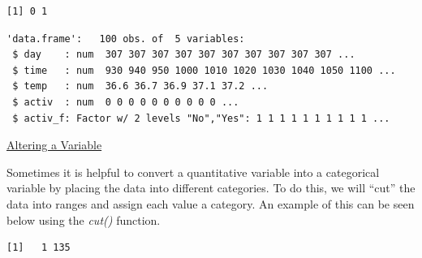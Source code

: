 \documentclass[
  letterpaper,
  DIV=11,
  numbers=noendperiod]{scrreprt}
\newenvironment{Shaded}{\begin{snugshade}}{\end{snugshade}}
\newcommand{\AttributeTok}[1]{\textcolor[rgb]{0.40,0.45,0.13}{#1}}
\newcommand{\ConstantTok}[1]{\textcolor[rgb]{0.56,0.35,0.01}{#1}}
\newcommand{\DecValTok}[1]{\textcolor[rgb]{0.68,0.00,0.00}{#1}}
\newcommand{\FunctionTok}[1]{\textcolor[rgb]{0.28,0.35,0.67}{#1}}
\newcommand{\NormalTok}[1]{\textcolor[rgb]{0.00,0.23,0.31}{#1}}
\newcommand{\OtherTok}[1]{\textcolor[rgb]{0.00,0.23,0.31}{#1}}
\newcommand{\SpecialCharTok}[1]{\textcolor[rgb]{0.37,0.37,0.37}{#1}}
\newcommand{\StringTok}[1]{\textcolor[rgb]{0.13,0.47,0.30}{#1}}
\begin{document}
\begin{verbatim}
[1] 0 1
\end{verbatim}

\begin{Shaded}
\end{Shaded}

\begin{verbatim}
'data.frame':   100 obs. of  5 variables:
 $ day    : num  307 307 307 307 307 307 307 307 307 307 ...
 $ time   : num  930 940 950 1000 1010 1020 1030 1040 1050 1100 ...
 $ temp   : num  36.6 36.7 36.9 37.1 37.2 ...
 $ activ  : num  0 0 0 0 0 0 0 0 0 0 ...
 $ activ_f: Factor w/ 2 levels "No","Yes": 1 1 1 1 1 1 1 1 1 1 ...
\end{verbatim}

\begin{watch}{}{}
    \href{https://youtu.be/fAcw4RpMgzU}{Altering a Variable}
\end{watch}

Sometimes it is helpful to convert a quantitative variable into a
categorical variable by placing the data into different categories. To
do this, we will ``cut'' the data into ranges and assign each value a
category. An example of this can be seen below using the \emph{cut()}
function.

\begin{Shaded}
\end{Shaded}

\begin{verbatim}
[1]   1 135
\end{verbatim}

\begin{Shaded}
\end{Shaded}
\end{document}
